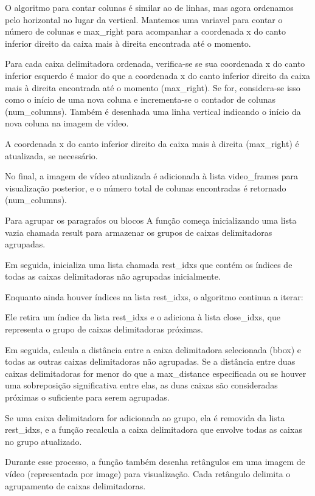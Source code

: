 \documentclass[english, 
               brazil, 
               bsc] %
               {dcomp-abntex2}
\begin{document}
O algoritmo para contar colunas é similar ao de linhas, mas agora ordenamos pelo horizontal no lugar da vertical.
Mantemos uma variavel para contar o número de colunas e max\_right para acompanhar a coordenada x do canto inferior direito da caixa mais à direita encontrada até o momento.

Para cada caixa delimitadora ordenada, verifica-se se sua coordenada x do canto inferior esquerdo é maior do que a coordenada x do canto inferior direito da caixa mais à direita encontrada até o momento (max\_right). Se for, considera-se isso como o início de uma nova coluna e incrementa-se o contador de colunas (num\_columns). Também é desenhada uma linha vertical indicando o início da nova coluna na imagem de vídeo.

A coordenada x do canto inferior direito da caixa mais à direita (max\_right) é atualizada, se necessário.

No final, a imagem de vídeo atualizada é adicionada à lista video\_frames para visualização posterior, e o número total de colunas encontradas é retornado (num\_columns).


Para agrupar os paragrafos ou blocos A função começa inicializando uma lista vazia chamada result para armazenar os grupos de caixas delimitadoras agrupadas.

Em seguida, inicializa uma lista chamada rest\_idxs que contém os índices de todas as caixas delimitadoras não agrupadas inicialmente.

Enquanto ainda houver índices na lista rest\_idxs, o algoritmo continua a iterar:

Ele retira um índice da lista rest\_idxs e o adiciona à lista close\_idxs, que representa o grupo de caixas delimitadoras próximas.

Em seguida, calcula a distância entre a caixa delimitadora selecionada (bbox) e todas as outras caixas delimitadoras não agrupadas. Se a distância entre duas caixas delimitadoras for menor do que a max\_distance especificada ou se houver uma sobreposição significativa entre elas, as duas caixas são consideradas próximas o suficiente para serem agrupadas.

Se uma caixa delimitadora for adicionada ao grupo, ela é removida da lista rest\_idxs, e a função recalcula a caixa delimitadora que envolve todas as caixas no grupo atualizado.

Durante esse processo, a função também desenha retângulos em uma imagem de vídeo (representada por image) para visualização. Cada retângulo delimita o agrupamento de caixas delimitadoras.
\end{document}
